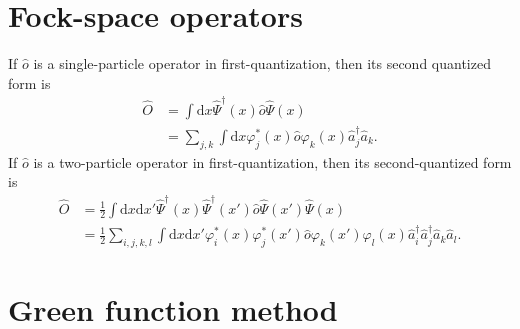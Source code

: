\documentclass[11pt, a4paper]{article}
\newcommand{\dd}{\mathrm{d}}
\begin{document}
\section{Fock-space operators}
If $\hat o$ is a single-particle operator in first-quantization, then its second quantized form is 
\begin{align*}
    \hat O &= \int\dd x\hat\Psi^{\dagger}(x)\hat o\hat\Psi(x) \\
    & = \sum\limits_{j,k} \int \dd x \varphi^*_j(x) \hat o \varphi_k(x) \hat a_j^{\dagger}\hat a_k.
\end{align*} 
If $\hat o$ is a two-particle operator in first-quantization, then its second-quantized form is 
\begin{align*}
    \hat O &= \frac{1}{2} \int\dd x \dd x' \hat\Psi^{\dagger}(x) \hat\Psi^{\dagger}(x') \hat o \hat\Psi(x') \hat\Psi(x) \\
    & = \frac{1}{2} \sum\limits_{i,j,k,l} \int\dd x \dd x' \varphi^*_i(x)\varphi^*_j(x') \hat o \varphi_k(x')\varphi_l(x)
    \hat a_i^{\dagger}\hat a_j^{\dagger}\hat a_k\hat a_l.
\end{align*}


\section{Green function method}
\end{document}
